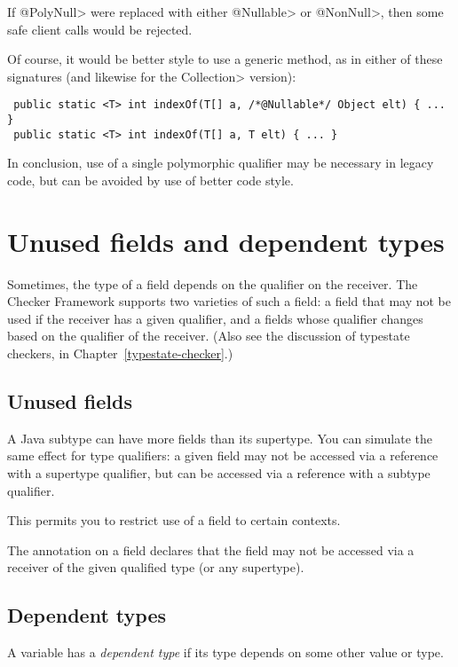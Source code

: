 If \<@PolyNull> were replaced with either \<@Nullable> or \<@NonNull>, then
some safe client calls would be rejected.

Of course, it would be better style to use a generic method, as in either
of these signatures (and likewise for the \<Collection> version):

\begin{Verbatim}
 public static <T> int indexOf(T[] a, /*@Nullable*/ Object elt) { ... }
 public static <T> int indexOf(T[] a, T elt) { ... }
\end{Verbatim}

In conclusion, use of a single polymorphic qualifier may be necessary in
legacy code, but can be avoided by use of better code style.


\section{Unused fields and dependent types\label{unused-fields-and-dependent-types}}

Sometimes, the type of a field depends on the qualifier on the receiver.
The Checker Framework supports two varieties of such a field:  a field that
may not be used if the receiver has a given qualifier, and a fields whose
qualifier changes based on the qualifier of the receiver.
(Also see the discussion of typestate checkers, in
Chapter~\ref{typestate-checker}.)


\subsection{Unused fields\label{unused-fields}}

A Java subtype can have more fields than its supertype.  You can simulate
the same effect for type qualifiers:  a given field may not be accessed via
a reference with a supertype qualifier, but can be accessed via a reference
with a subtype qualifier.

This permits you to restrict use of a field to certain contexts.

The  annotation
on a field declares that the field may not be accessed via a receiver of
the given qualified type (or any supertype).


\subsection{Dependent types\label{dependent-types}}

A variable has a \emph{dependent type} if its type depends on some other
value or type.

